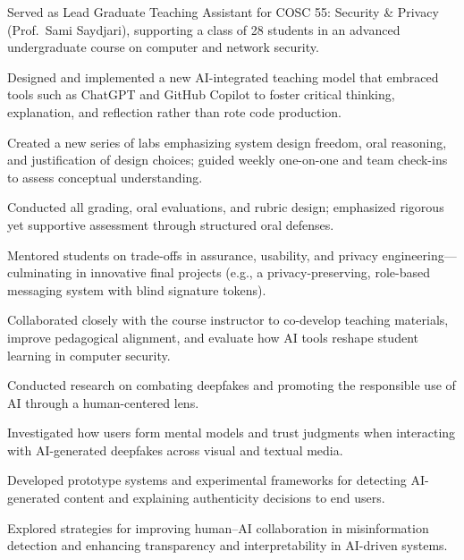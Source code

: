 \documentclass[letterpaper,10pt]{article}
\begin{document}
\begin{bullets}
  \item Served as Lead Graduate Teaching Assistant for COSC 55: Security \& Privacy (Prof.\ Sami Saydjari), supporting a class of 28 students in an advanced undergraduate course on computer and network security.
  \item Designed and implemented a new AI-integrated teaching model that embraced tools such as ChatGPT and GitHub Copilot to foster critical thinking, explanation, and reflection rather than rote code production.
  \item Created a new series of labs emphasizing system design freedom, oral reasoning, and justification of design choices; guided weekly one-on-one and team check-ins to assess conceptual understanding.
  \item Conducted all grading, oral evaluations, and rubric design; emphasized rigorous yet supportive assessment through structured oral defenses.
  \item Mentored students on trade-offs in assurance, usability, and privacy engineering---culminating in innovative final projects (e.g., a privacy-preserving, role-based messaging system with blind signature tokens).
  \item Collaborated closely with the course instructor to co-develop teaching materials, improve pedagogical alignment, and evaluate how AI tools reshape student learning in computer security.
\end{bullets}

\begin{bullets}
  \item Conducted research on combating deepfakes and promoting the responsible use of AI through a human-centered lens.
  \item Investigated how users form mental models and trust judgments when interacting with AI-generated deepfakes across visual and textual media.
  \item Developed prototype systems and experimental frameworks for detecting AI-generated content and explaining authenticity decisions to end users.
  \item Explored strategies for improving human--AI collaboration in misinformation detection and enhancing transparency and interpretability in AI-driven systems.
\end{bullets}
\end{document}
